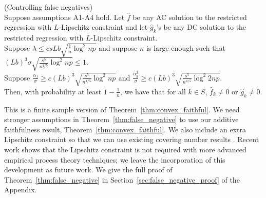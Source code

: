 \begin{theorem} (Controlling false negatives) \\
\label{thm:false_negative}
Suppose assumptions A1-A4 hold. Let $\hat{f}$ be any AC solution to the restricted regression with $L$-Lipschitz constraint and let $\hat{g}_k$'s be any DC solution to the restricted regression with $L$-Lipschitz constraint.\\

Suppose $\lambda \leq c sLb  \sqrt{\frac{1}{n} \log^2 np}$ and suppose $n$ is large enough such that $(Lb)^3 \sigma \sqrt{\frac{s^5}{n^{4/5}} \log^2 np} \leq 1$.\\

Suppose 
$\frac{\alpha_f}{\sigma} \geq c (Lb)^3 \sqrt{\frac{s^5}{n^{4/5}} \log^2 np}$ and $\frac{\alpha_g^2}{\sigma} \geq c (Lb)^3 \sqrt{\frac{s^5}{n^{4/5}} \log^2 2np}$.\\

Then, with probability at least $1 - \frac{1}{n}$, we have that for all $k \in S$, $\hat{f}_k \neq 0$ or $\hat{g}_k \neq 0$.

\end{theorem}

This is a finite sample version of
Theorem~\ref{thm:convex_faithful}. We need stronger assumptions in
Theorem~\ref{thm:false_negative} to use our additive faithfulness
result, Theorem~\ref{thm:convex_faithful}. We also include an extra
Lipschitz constraint so that we can use existing covering number
results \cite{Bronshtein:76}. Recent work
\cite{Guntu:13} shows that the Lipschitz constraint
is not required with more advanced empirical process theory
techniques; we leave the incorporation of this development as future work. 
We give the full proof of Theorem~\ref{thm:false_negative}
in Section~\ref{sec:false_negative_proof} of the Appendix.

